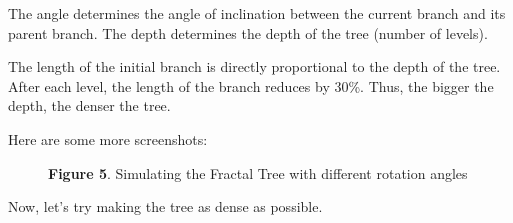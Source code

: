 \documentclass{resonance}
\begin{document}
The angle determines the angle of inclination between the current branch and its parent branch. The depth determines the depth of the tree (number of levels).

The length of the initial branch is directly proportional to the depth of the tree. After each level, the length of the branch reduces by 30\%. Thus, the bigger the depth, the denser the tree.

Here are some more screenshots:

\pagebreak

\begin{figure}[ht]

\vspace{10pt}
\hspace{-10pt}\scriptsize{\textbf{Figure 5}. \normalfont Simulating the Fractal Tree with different rotation angles}
\end{figure}

\setlength{\leftskip}{-0cm}
Now, let's try making the tree as dense as possible.\\
\end{document}
